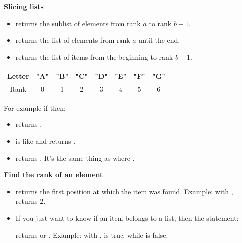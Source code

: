 \documentclass[11pt,class=report,crop=false]{standalone}
\begin{document}
\bigskip
    
\textbf{Slicing lists}
  
  \begin{itemize}
    \item {} \quad returns the sublist of elements from rank $a$ to rank $b-1$.
    
    \item {} \quad returns the list of elements from rank $a$ until the end.
      
    \item {} \quad returns the list of items from the beginning to rank $b-1$.
    

\end{itemize}


\medskip
 \begin{center}
\begin{tabular}{|c|||c|c|c|c|c|c|c|}
\hline
Letter & \textbf{"A"} & \textbf{"B"} & \textbf{"C"} & \textbf{"D"} & \textbf{"E"} & \textbf{"F"} & \textbf{"G"} \\ \hline
Rank & 0 & 1 & 2 & 3 & 4 & 5 & 6 \\ \hline
\end{tabular}
\end{center}
\medskip
  
    For example if  then:
  \begin{itemize}
    \item {} \quad returns \ci{["B","C","D"]}.
    \item {} \quad is like  and returns \ci{["A","B"]}.   
    \item {} \quad returns \ci{["E","F","G"]}.  It's the same thing 
     as  where .
  \end{itemize} 

\bigskip

\textbf{Find the rank of an element} 

\begin{itemize}

    \item   
    returns the first position at which the item was found. Example: with ,
    returns $2$.

  \item If you just want to know if an item belongs to a list, then the statement:  
  
  returns  or .
  Example: with ,
   \og{}\fg{} is true, while \og{}\fg{} is false.
  
\end{itemize}
\end{document}
